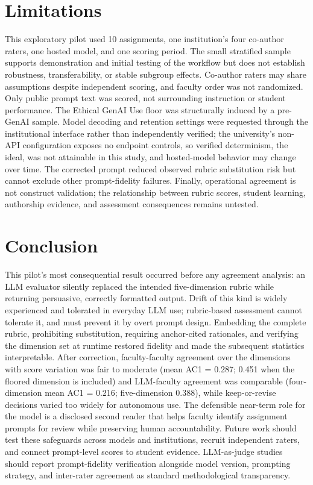 \documentclass[sigconf]{acmart}
\begin{document}
\section{Limitations}
\label{sec:limitations}
This exploratory pilot used 10 assignments, one institution's four co-author raters, one hosted model, and one scoring period. The small stratified sample supports demonstration and initial testing of the workflow but does not establish robustness, transferability, or stable subgroup effects. Co-author raters may share assumptions despite independent scoring, and faculty order was not randomized. Only public prompt text was scored, not surrounding instruction or student performance. The Ethical GenAI Use floor was structurally induced by a pre-GenAI sample. Model decoding and retention settings were requested through the institutional interface rather than independently verified; the university's non-API configuration exposes no endpoint controls, so verified determinism, the ideal, was not attainable in this study, and hosted-model behavior may change over time. The corrected prompt reduced observed rubric substitution risk but cannot exclude other prompt-fidelity failures. Finally, operational agreement is not construct validation; the relationship between rubric scores, student learning, authorship evidence, and assessment consequences remains untested.

\section{Conclusion}
This pilot's most consequential result occurred before any agreement analysis: an LLM evaluator silently replaced the intended five-dimension rubric while returning persuasive, correctly formatted output. Drift of this kind is widely experienced and tolerated in everyday LLM use; rubric-based assessment cannot tolerate it, and must prevent it by overt prompt design. Embedding the complete rubric, prohibiting substitution, requiring anchor-cited rationales, and verifying the dimension set at runtime restored fidelity and made the subsequent statistics interpretable. After correction, faculty-faculty agreement over the dimensions with score variation was fair to moderate (mean AC1 = 0.287; 0.451 when the floored dimension is included) and LLM-faculty agreement was comparable (four-dimension mean AC1 = 0.216; five-dimension 0.388), while keep-or-revise decisions varied too widely for autonomous use. The defensible near-term role for the model is a disclosed second reader that helps faculty identify assignment prompts for review while preserving human accountability. Future work should test these safeguards across models and institutions, recruit independent raters, and connect prompt-level scores to student evidence. LLM-as-judge studies should report prompt-fidelity verification alongside model version, prompting strategy, and inter-rater agreement as standard methodological transparency.
\end{document}
